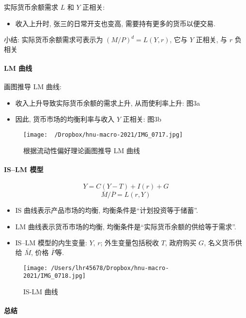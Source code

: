 \documentclass[11pt]{ctexart}
\begin{document}
\clearpage

实际货币余额需求 $L$ 和 $Y$ 正相关:
\begin{itemize}
\item
  收入上升时, 张三的日常开支也变高, 需要持有更多的货币以便交易.
\end{itemize}
小结: 实际货币余额需求可表示为 $(M/P)^d = L(Y,  r)$, 它与 $Y$ 正相关, 与 $r$ 负相关

\paragraph{LM 曲线}
画图推导 LM 曲线:

\begin{itemize}
\item
  收入上升导致实际货币余额的需求上升, 从而使利率上升: 图3a
\item
  因此,  货币市场的均衡利率与收入 $Y$ 正相关: 图3b
\end{itemize}

\begin{figure}[htbp]
\centering
\texttt{[image: ~/Dropbox/hnu-macro-2021/IMG\_0717.jpg]}
\caption{根据流动性偏好理论画图推导 LM 曲线}
\end{figure}

\paragraph{IS--LM 模型}

\[Y = C(Y-T) + I(r) + G \tag{IS}\]
\[{\overline{M} / \overline{P}} = L(r, Y) \tag{LM}\]
\begin{itemize}
\item
  IS 曲线表示产品市场的均衡,  均衡条件是``计划投资等于储蓄''. 
\item
  LM 曲线表示货币市场的均衡,  均衡条件是``实际货币余额的供给等于需求''.
\item
  IS--LM 模型的内生变量: $Y$,  $r$; 外生变量包括税收 $T$,  政府购买 $G$,  名义货币供给 $\bar{M}$,  价格 $\bar{P}$等.  
\end{itemize}

\begin{figure}[htbp]
\centering
\texttt{[image: /Users/lhr45678/Dropbox/hnu-macro-2021/IMG\_0718.jpg]}
\caption{IS-LM 曲线}
\label{fig:is-lm2}
\end{figure}

\paragraph{总结}
\end{document}
